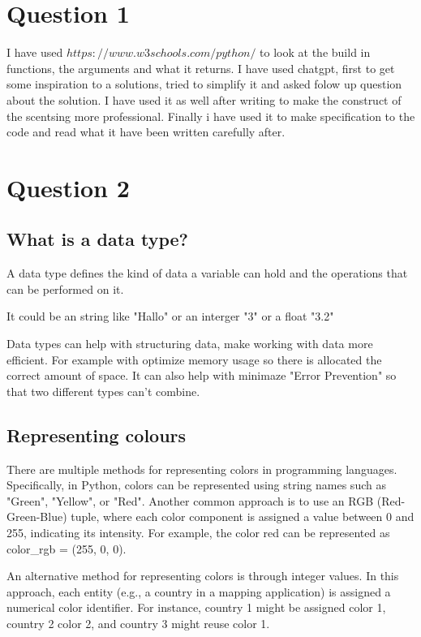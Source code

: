 \documentclass{article}
\begin{document}
\section{Question 1}

I have used $https://www.w3schools.com/python/$ to look at the build in functions, the arguments and  what it returns. I have used chatgpt, first to get some inspiration to a solutions, tried to simplify it and asked folow up question about the solution. I have used it as well after writing to make the construct of the scentsing more professional. Finally i have used it to make specification to the code and read what it have been written carefully after.



\section{Question 2}


\subsection{What is a data type?}

A data type defines the kind of data a variable can hold and the operations that can be performed on it. 

It could be an string like "Hallo" or an interger "3" or a float "3.2" 

Data types can help with structuring data, make working with data more efficient. For example with optimize memory usage so there is allocated the correct amount of space. It can also help with minimaze "Error Prevention" so that two different types can't combine.



\subsection{Representing colours}

There are multiple methods for representing colors in programming languages. Specifically, in Python, colors can be represented using string names such as "Green", "Yellow", or "Red". Another common approach is to use an RGB (Red-Green-Blue) tuple, where each color component is assigned a value between 0 and 255, indicating its intensity. For example, the color red can be represented as color_rgb = (255, 0, 0).

An alternative method for representing colors is through integer values. In this approach, each entity (e.g., a country in a mapping application) is assigned a numerical color identifier. For instance, country 1 might be assigned color 1, country 2 color 2, and country 3 might reuse color 1.
\end{document}
